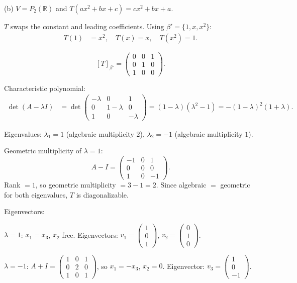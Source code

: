 \documentclass{article}
\begin{document}
\bigskip

\noindent\textnormal{(b)} $V = P_2(\mathbb{R})$ and $T(ax^2 + bx + c) = cx^2 + bx + a$.

\begin{mdframed}[linewidth=1pt]
$T$ swaps the constant and leading coefficients. Using $\beta' = \{1, x, x^2\}$:
\begin{align*}
T(1) &= x^2, \quad T(x) = x, \quad T(x^2) = 1.
\end{align*}

\[
[T]_{\beta'} = \begin{pmatrix} 0 & 0 & 1 \\ 0 & 1 & 0 \\ 1 & 0 & 0 \end{pmatrix}.
\]

\textnormal{Characteristic polynomial:}
\begin{align*}
\det(A - \lambda I) &= \det\begin{pmatrix} -\lambda & 0 & 1 \\ 0 & 1-\lambda & 0 \\ 1 & 0 & -\lambda \end{pmatrix} = (1-\lambda)(\lambda^2 - 1) = -(1-\lambda)^2(1+\lambda).
\end{align*}

Eigenvalues: $\lambda_1 = 1$ (algebraic multiplicity $2$), $\lambda_2 = -1$ (algebraic multiplicity $1$).

\textnormal{Geometric multiplicity of $\lambda = 1$:}
\[
A - I = \begin{pmatrix} -1 & 0 & 1 \\ 0 & 0 & 0 \\ 1 & 0 & -1 \end{pmatrix}.
\]
Rank $= 1$, so geometric multiplicity $= 3 - 1 = 2$. Since algebraic $=$ geometric for both eigenvalues, $T$ is \textnormal{diagonalizable}.

\textnormal{Eigenvectors:}

$\lambda = 1$: $x_1 = x_3$, $x_2$ free. Eigenvectors: $v_1 = \begin{pmatrix}1\\0\\1\end{pmatrix}$, $v_2 = \begin{pmatrix}0\\1\\0\end{pmatrix}$.

$\lambda = -1$: $A + I = \begin{pmatrix}1&0&1\\0&2&0\\1&0&1\end{pmatrix}$, so $x_1 = -x_3$, $x_2 = 0$. Eigenvector: $v_3 = \begin{pmatrix}1\\0\\-1\end{pmatrix}$.


\end{mdframed}
\end{document}
